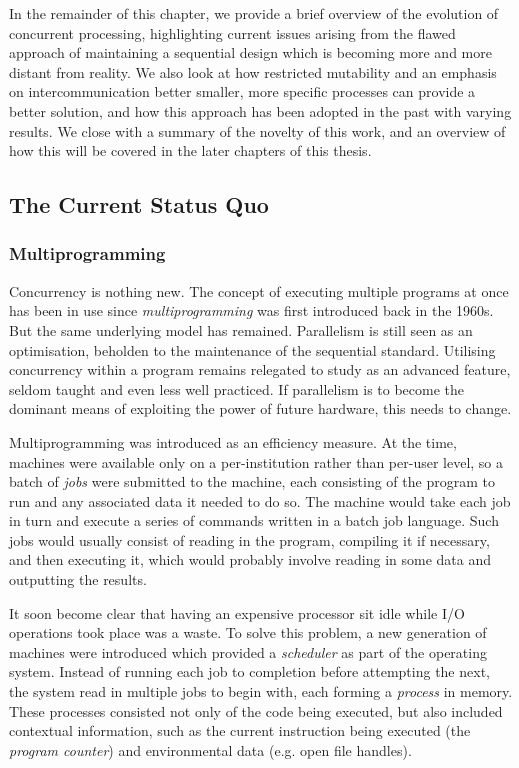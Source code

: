 In the remainder of this chapter, we provide a brief overview of the
evolution of concurrent processing, highlighting current issues
arising from the flawed approach of maintaining a sequential design
which is becoming more and more distant from reality.  We also look at
how restricted mutability and an emphasis on intercommunication better
smaller, more specific processes can provide a better solution, and
how this approach has been adopted in the past with varying results.
We close with a summary of the novelty of this work, and an overview
of how this will be covered in the later chapters of this thesis.

\subsection{The Current Status Quo}

\subsubsection{Multiprogramming}

Concurrency is nothing new.  The concept of executing multiple
programs at once has been in use since \emph{multiprogramming} was
first introduced back in the 1960s.  But the same underlying model has
remained.  Parallelism is still seen as an optimisation, beholden to
the maintenance of the sequential standard.  Utilising concurrency
within a program remains relegated to study as an advanced feature,
seldom taught and even less well practiced.  If parallelism is to
become the dominant means of exploiting the power of future hardware,
this needs to change.

Multiprogramming was introduced as an efficiency measure.  At the
time, machines were available only on a per-institution rather than
per-user level, so a batch of \emph{jobs} were submitted to the
machine, each consisting of the program to run and any associated data
it needed to do so.  The machine would take each job in turn and
execute a series of commands written in a batch job language.  Such
jobs would usually consist of reading in the program, compiling it if
necessary, and then executing it, which would probably involve reading
in some data and outputting the results.

It soon become clear that having an expensive processor sit idle while
I/O operations took place was a waste.  To solve this problem, a new
generation of machines were introduced which provided a
\emph{scheduler} as part of the operating system.  Instead of running
each job to completion before attempting the next, the system read in
multiple jobs to begin with, each forming a \emph{process} in memory.
These processes consisted not only of the code being executed, but
also included contextual information, such as the current instruction
being executed (the \emph{program counter}) and environmental data
(e.g. open file handles).

